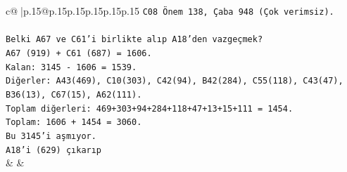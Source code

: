 \documentclass{article}
\begin{document}
{\begin{supertabular}{c@{$\;$}|p{.15\linewidth}@{}p{.15\linewidth}p{.15\linewidth}p{.15\linewidth}p{.15\linewidth}p{.15\linewidth}}
{{{\texttt{C08 Önem 138, Çaba 948 (Çok verimsiz).} \\
\\ 
\texttt{Belki A67 ve C61'i birlikte alıp A18'den vazgeçmek?} \\
\texttt{A67 (919) + C61 (687) = 1606.} \\
\texttt{Kalan: 3145 {-} 1606 = 1539.} \\
\texttt{Diğerler: A43(469), C10(303), C42(94), B42(284), C55(118), C43(47), B36(13), C67(15), A62(111).} \\
\texttt{Toplam diğerleri: 469+303+94+284+118+47+13+15+111 = 1454.} \\
\texttt{Toplam: 1606 + 1454 = 3060.} \\
\texttt{Bu 3145'i aşmıyor.} \\
\texttt{A18'i (629) çıkarıp} \\
            }
        }
    }
    & & \\ \\


\end{supertabular}}
\end{document}
